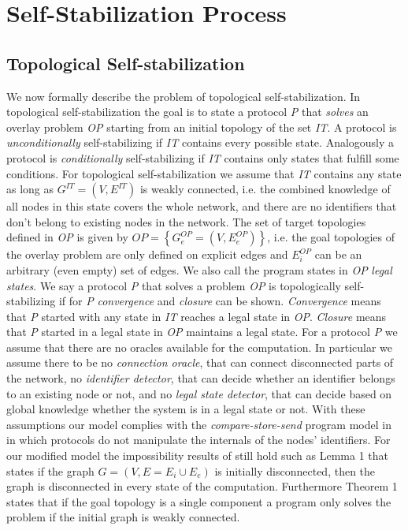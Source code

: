 \documentclass[11pt]{article}
\begin{document}
\section{Self-Stabilization Process}\label{alg}

\subsection{Topological Self-stabilization}
We now formally describe the problem of topological self-stabilization. In topological self-stabilization the goal is to state a protocol \emph{P} that \emph{solves} an overlay problem \emph{OP} starting from an initial topology of the set \emph{IT}. A protocol is \emph{unconditionally} self-stabilizing if \emph{IT} contains every possible state. Analogously a protocol is \emph{conditionally} self-stabilizing if \emph{IT} contains only states that fulfill some conditions. For topological self-stabilization we assume that \emph{IT} contains any state as long as $G^{IT}=\left(V,E^{IT}\right)$ is weakly connected, i.e. the combined knowledge of all nodes in this state covers the whole network, and there are no identifiers that don't belong to existing nodes in the network.
The set of target topologies defined in \emph{OP} is given by $OP=\left\{G^{OP}_e=\left(V, E^{OP}_e\right)\right\}$, i.e. the goal topologies of the overlay problem are only defined on explicit edges and $E^{OP}_i$ can be an arbitrary (even empty) set of edges. We also call the program states in \emph{OP} \emph{legal states}. We say a protocol \emph{P} that solves a problem \emph{OP} is topologically self-stabilizing if for \emph{P} \emph{convergence} and \emph{closure} can be shown. \emph{Convergence} means that \emph{P} started with any state in \emph{IT} reaches a legal state in \emph{OP}. \emph{Closure} means that \emph{P} started in a legal state in \emph{OP} maintains a legal state.
For a protocol \emph{P} we assume that there are no oracles available for the computation. In particular we assume there to be no \emph{connection oracle}, that can connect disconnected parts of the network, no \emph{identifier detector}, that can decide whether an identifier belongs to an existing node or not, and no \emph{legal state detector}, that can decide based on global knowledge whether the system is in a legal state or not.
With these assumptions our model complies with the \emph{compare-store-send} program model in \cite{NNS11:corona} in which protocols do not manipulate the internals of the nodes' identifiers. For our modified model the impossibility results of \cite{NNS11:corona} still hold such as Lemma 1 that states if the graph $G=(V,E=E_i \cup E_e)$ is initially disconnected, then the graph is disconnected in every state of the computation. Furthermore Theorem 1 states that if the goal topology is a single component a program only solves the problem if the initial graph is weakly connected.
\end{document}
